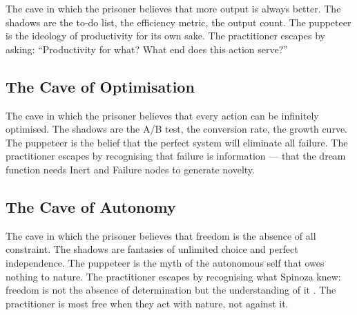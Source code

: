 The cave in which the prisoner believes that more output is always better. The
shadows are the to-do list, the efficiency metric, the output count. The
puppeteer is the ideology of productivity for its own sake. The practitioner
escapes by asking: ``Productivity for what? What end does this action serve?''

\subsection{The Cave of Optimisation}

The cave in which the prisoner believes that every action can be infinitely
optimised. The shadows are the A/B test, the conversion rate, the growth curve.
The puppeteer is the belief that the perfect system will eliminate all failure.
The practitioner escapes by recognising that failure is information --- that
the dream function needs Inert and Failure nodes to generate novelty.

\subsection{The Cave of Autonomy}

The cave in which the prisoner believes that freedom is the absence of all
constraint. The shadows are fantasies of unlimited choice and perfect
independence. The puppeteer is the myth of the autonomous self that owes nothing
to nature. The practitioner escapes by recognising what Spinoza knew: freedom
is not the absence of determination but the understanding of it
\parencite[V.P42]{spinoza1994ethics}. The
practitioner is most free when they act with nature, not against it.

